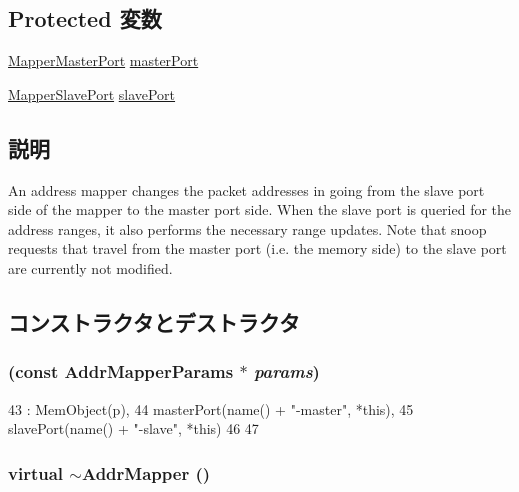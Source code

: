 \subsection*{Protected 変数}
\begin{DoxyCompactItemize}
\item 
\hyperlink{classAddrMapper_1_1MapperMasterPort}{MapperMasterPort} \hyperlink{classAddrMapper_a36c3558566dd375b12f573c2ea62992d}{masterPort}
\item 
\hyperlink{classAddrMapper_1_1MapperSlavePort}{MapperSlavePort} \hyperlink{classAddrMapper_a2a442ca0515b14d53305139d239ce090}{slavePort}
\end{DoxyCompactItemize}


\subsection{説明}
An address mapper changes the packet addresses in going from the slave port side of the mapper to the master port side. When the slave port is queried for the address ranges, it also performs the necessary range updates. Note that snoop requests that travel from the master port (i.e. the memory side) to the slave port are currently not modified. 

\subsection{コンストラクタとデストラクタ}
\hypertarget{classAddrMapper_a65d4ce504585c7421d5f7e6aba8ac336}{
\subsubsection[{AddrMapper}]{ (const AddrMapperParams $\ast$ {\em params})}}
\label{classAddrMapper_a65d4ce504585c7421d5f7e6aba8ac336}



\begin{DoxyCode}
43     : MemObject(p),
44       masterPort(name() + "-master", *this),
45       slavePort(name() + "-slave", *this)
46 {
47 }
\end{DoxyCode}
\hypertarget{classAddrMapper_a934511153fe50240d4d25a79586c4006}{
\subsubsection[{$\sim$AddrMapper}]{\setlength{\rightskip}{0pt plus 5cm}virtual $\sim${\bf AddrMapper} ()}}
\label{classAddrMapper_a934511153fe50240d4d25a79586c4006}



